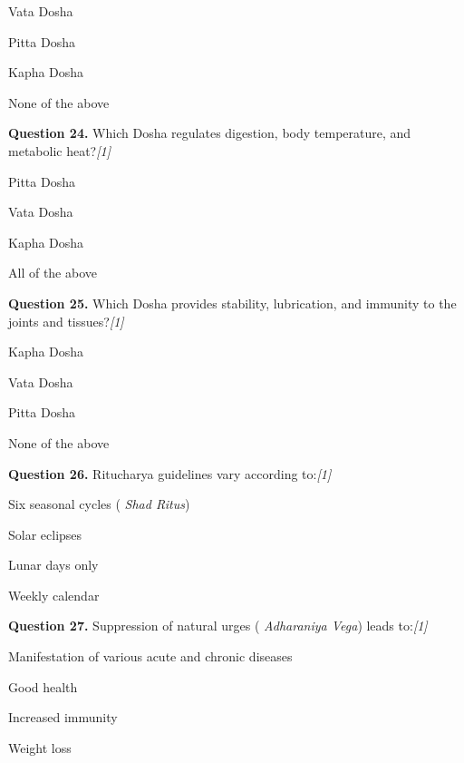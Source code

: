 \documentclass[11pt,a4paper]{article}
\newcommand{\pts}[1]{\hfill   \textit{[#1]}}
\begin{document}
\begin{parts}
  \item Vata Dosha
  \item Pitta Dosha
  \item Kapha Dosha
  \item None of the above
\end{parts}

\medskip




\noindent   \textbf{Question 24.} Which Dosha regulates digestion, body temperature, and metabolic heat?\pts{1}

\begin{parts}
  \item Pitta Dosha
  \item Vata Dosha
  \item Kapha Dosha
  \item All of the above
\end{parts}

\medskip




\noindent   \textbf{Question 25.} Which Dosha provides stability, lubrication, and immunity to the joints and tissues?\pts{1}

\begin{parts}
  \item Kapha Dosha
  \item Vata Dosha
  \item Pitta Dosha
  \item None of the above
\end{parts}

\medskip




\noindent   \textbf{Question 26.} Ritucharya guidelines vary according to:\pts{1}

\begin{parts}
  \item Six seasonal cycles (   \textit{Shad Ritus})
  \item Solar eclipses
  \item Lunar days only
  \item Weekly calendar
\end{parts}

\medskip




\noindent   \textbf{Question 27.} Suppression of natural urges (   \textit{Adharaniya Vega}) leads to:\pts{1}

\begin{parts}
  \item Manifestation of various acute and chronic diseases
  \item Good health
  \item Increased immunity
  \item Weight loss
\end{parts}
\end{document}
